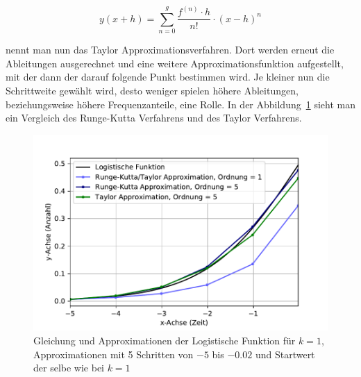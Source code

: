 \begin{equation}
y(x+h)
=
\sum_{n=0}^{g}{\frac{f^{(n)}\cdot h}{n!}}\cdot (x-h)^{n}
\label{taylor:section:taylorapproximation}
\end{equation}

nennt man nun das Taylor Approximationsverfahren.
Dort werden erneut die Ableitungen ausgerechnet und eine weitere Approximationsfunktion aufgestellt, mit der dann der darauf folgende Punkt bestimmen wird.
Je kleiner nun die Schrittweite gewählt wird, desto weniger spielen höhere Ableitungen, beziehungsweise höhere Frequenzanteile, eine Rolle.
In der Abbildung~\ref{taylor:section:fig:LogisticFunctionApproximation} sieht man ein Vergleich des Runge-Kutta Verfahrens und des Taylor Verfahrens.

\begin{figure}
	\begin{center}
	\includegraphics[width=12cm]{papers/taylor/taylorPictures/LogisticFunction.pdf}
	\caption{Gleichung und Approximationen der Logistische Funktion für $k=1$, Approximationen mit 5 Schritten von $-5$ bis $-0.02$ und Startwert der selbe wie bei $k=1$}
	\label{taylor:section:fig:LogisticFunctionApproximation}
	\end{center}
\end{figure}

